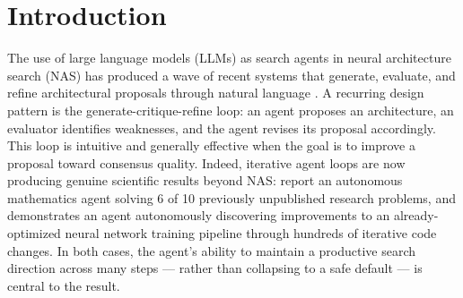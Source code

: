 \maketitle

\begin{abstract}
LLM-guided search suffers from consensus bias: agents that generate and refine
architectural proposals under critique converge prematurely toward well-established
designs, abandoning heterodox ideas at the first sign of resistance. We introduce
the \textbf{Heterodox Agent Architecture Search} (\haas{}) framework, which
addresses this by pre-committing an agent to a non-negotiable architectural
hypothesis. Rather than revising the hypothesis when challenged, the agent must
defend it and seek improvements that remain within the committed constraint ---
analogous to a stubborn scientist who explores the consequences of a minority
hypothesis rather than deferring to the prevailing consensus. We validate
\haas{} in two phases: a free-text behavioral study across seven architectural
hypotheses, and a controlled comparison on \nasbench{}/NATS-TSS where
compliance is exact and performance is pre-evaluated. Committed agents
maintain hypothesis fidelity throughout, while standard generate-refine
baselines collapse under the first challenge. In one case, the enforced
constraint leads \haas{} to \emph{outperform} the unconstrained baseline,
suggesting that directed commitment can expose favorable regions of the
search space that consensus-seeking agents avoid.
\end{abstract}

\section{Introduction}
\label{sec:intro}

The use of large language models (LLMs) as search agents in neural architecture
search (NAS) has produced a wave of recent systems that generate, evaluate, and
refine architectural proposals through natural language
\citep{zheng2023can,nasir2024llmatic}. A recurring design pattern is the
generate-critique-refine loop: an agent proposes an architecture, an evaluator
identifies weaknesses, and the agent revises its proposal accordingly. This loop
is intuitive and generally effective when the goal is to improve a proposal
toward consensus quality. Indeed, iterative agent loops are now producing
genuine scientific results beyond NAS: \citet{feng2026aletheia} report an
autonomous mathematics agent solving 6 of 10 previously unpublished research
problems, and \citet{karpathy2026autoresearch} demonstrates an agent
autonomously discovering improvements to an already-optimized neural network
training pipeline through hundreds of iterative code changes. In both cases,
the agent's ability to maintain a productive search direction across many steps
--- rather than collapsing to a safe default --- is central to the result.

